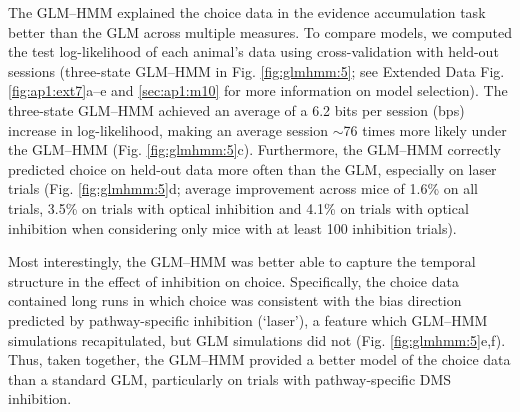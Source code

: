 \begin{figure}[t!]
\end{figure}

The GLM–HMM explained the choice data in the evidence accumulation task better than the GLM across multiple measures. To compare models, we computed the test log-likelihood of each animal’s data using cross-validation with held-out sessions (three-state GLM–HMM in Fig. \ref{fig:glmhmm:5}; see Extended Data Fig. \ref{fig:ap1:ext7}a–e and \ref{sec:ap1:m10} for more information on model selection). The three-state GLM–HMM achieved an average of a 6.2 bits per session (bps) increase in log-likelihood, making an average session $\sim$76 times more likely under the GLM–HMM (Fig. \ref{fig:glmhmm:5}c). Furthermore, the GLM–HMM correctly predicted choice on held-out data more often than the GLM, especially on laser trials (Fig. \ref{fig:glmhmm:5}d; average improvement across mice of 1.6\% on all trials, 3.5\% on trials with optical inhibition and 4.1\% on trials with optical inhibition when considering only mice with at least 100 inhibition trials).

Most interestingly, the GLM–HMM was better able to capture the temporal structure in the effect of inhibition on choice. Specifically, the choice data contained long runs in which choice was consistent with the bias direction predicted by pathway-specific inhibition (‘laser’), a feature which GLM–HMM simulations recapitulated, but GLM simulations did not (Fig. \ref{fig:glmhmm:5}e,f). Thus, taken together, the GLM–HMM provided a better model of the choice data than a standard GLM, particularly on trials with pathway-specific DMS inhibition.